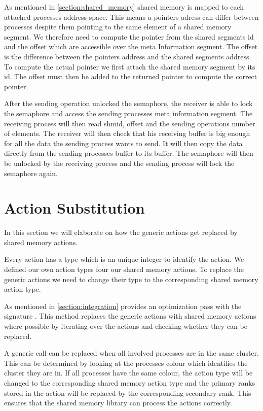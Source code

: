 As mentioned in \autoref{section:shared_memory} shared memory is mapped to each attached processes address space.
This means a pointers adress can differ between processes despite them pointing to the same element of a shared memory segment.
We therefore need to compute the pointer from the shared segments id and the offset which are accessible over the meta Information segment.
The offset is the difference between the pointers address and the shared segments address.  
To compute the actual pointer we first attach the shared memory segment by its id.
The offset must then be added to the returned pointer to compute the correct pointer.

After the sending operation unlocked the semaphore, the receiver is able to lock the semaphore and access the sending processes meta information segment.
The receiving process will then read shmid, offset and the sending operations number of elements.
The receiver will then check that his receiving buffer is big enough for all the data the sending process wants to send.
It will then copy the data directly from the sending processes buffer to its buffer.
The semaphore will then be unlocked by the receiving process and the sending process will lock the semaphore again. 


\section{Action Substitution}

In this section we will elaborate on how the generic actions get replaced by shared memory actions.

Every action has a type which is an unique integer to identify the action.
We defined our own action types four our shared memory actions.
To replace the generic actions we need to change their type to the corresponding shared memory action type.

As mentioned in \autoref{section:integration}  provides an optimization pass with the signature .
This method replaces the generic actions with shared memory actions where possible by iterating over the actions and checking whether they can be replaced.

A generic call can be replaced when all involved processes are in the same cluster.
This can be determined by looking at the processes colour which identifies the cluster they are in.
If all processes have the same colour, the action type will be changed to the corresponding shared memory action type and the primary ranks stored in the action will be replaced by the corresponding secondary rank.
This ensures that the shared memory library can process the actions correctly.

